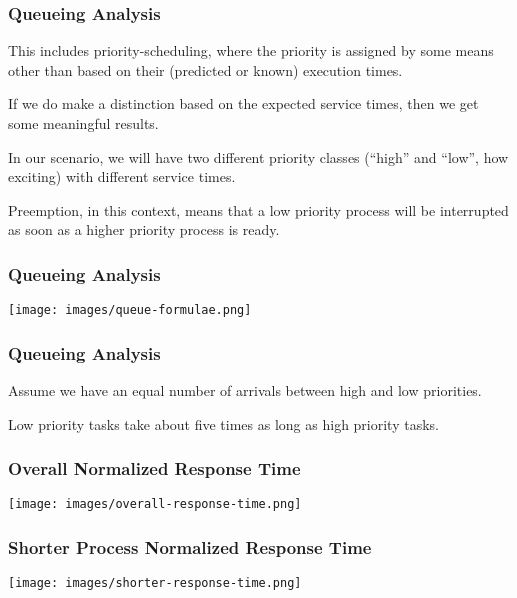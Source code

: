 \begin{frame}
\frametitle{Queueing Analysis}

This includes priority-scheduling, where the priority is assigned by some means other than based on their (predicted or known) execution times. 

If we do make a distinction based on the expected service times, then we get some meaningful results. 

In our scenario, we will have two different priority classes (``high'' and ``low'', how exciting) with different service times.

Preemption, in this context, means that a low priority process will be interrupted as soon as a higher priority process is ready.

\end{frame}

\begin{frame}
\frametitle{Queueing Analysis}

\begin{center}
	\texttt{[image: images/queue-formulae.png]}
\end{center}


\end{frame}

\begin{frame}
\frametitle{Queueing Analysis}

Assume we have an equal number of arrivals between high and low priorities. 

Low priority tasks take about five times as long as high priority tasks. 


\end{frame}

\begin{frame}
\frametitle{Overall Normalized Response Time}

\begin{center}
	\texttt{[image: images/overall-response-time.png]}
\end{center}

\end{frame}

\begin{frame}
\frametitle{Shorter Process Normalized Response Time}

\begin{center}
	\texttt{[image: images/shorter-response-time.png]}
\end{center}

\end{frame}

